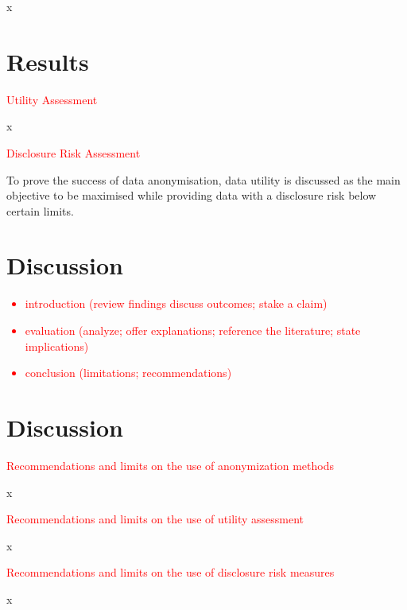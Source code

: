 \documentclass{article}
\begin{document}
x

\section{Results}

\textcolor{red}{Utility Assessment}

x

\textcolor{red}{Disclosure Risk Assessment}

To prove the success of data anonymisation, data utility is discussed as the main objective to be maximised while providing data with a disclosure risk below certain limits.

\section{Discussion}

\textcolor{red}{
\begin{itemize}
    \item introduction (review findings discuss outcomes; stake a claim)
    \item evaluation (analyze; offer explanations; reference the literature; state implications)    
    \item conclusion (limitations; recommendations)
\end{itemize}
} %

\section{Discussion}

\textcolor{red}{Recommendations and limits on the use of anonymization methods}
   
x

\textcolor{red}{Recommendations and limits on the use of utility assessment}

x

\textcolor{red}{Recommendations and limits on the use of disclosure risk measures}

x
\end{document}
